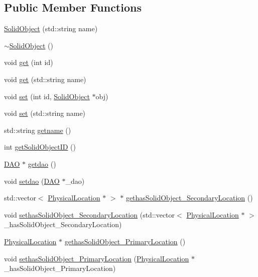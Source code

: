 \subsection*{Public Member Functions}
\begin{DoxyCompactItemize}
\item 
\hyperlink{class_solid_object_a8d752aace544c358d941c01b5786d2ee}{SolidObject} (std::string name)
\item 
\hyperlink{class_solid_object_a78b7c6dec129da027e767eb5d6303f6e}{$\sim$SolidObject} ()
\item 
void \hyperlink{class_solid_object_a76502cdc5f302d769508f196a0358d04}{get} (int id)
\item 
void \hyperlink{class_solid_object_afb027c9baf0d811d6f376abc10501ac9}{get} (std::string name)
\item 
void \hyperlink{class_solid_object_a02a27880f080df5e547ab316572173b9}{set} (int id, \hyperlink{class_solid_object}{SolidObject} $\ast$obj)
\item 
void \hyperlink{class_solid_object_aaa81c29478f33c17cf15ad1409fc06b2}{set} (std::string name)
\item 
std::string \hyperlink{class_solid_object_ae7b8a41f898f9463c0e298d3477fd95f}{getname} ()
\item 
int \hyperlink{class_solid_object_aa25bf35a0820f919489ce284cbdad480}{getSolidObjectID} ()
\item 
\hyperlink{class_d_a_o}{DAO} $\ast$ \hyperlink{class_solid_object_a82697845082b48fb3b2b90606e68259a}{getdao} ()
\item 
void \hyperlink{class_solid_object_aebdfc641ee348624ac5027e0a570dcd8}{setdao} (\hyperlink{class_d_a_o}{DAO} $\ast$\_\-dao)
\item 
std::vector$<$ \hyperlink{class_physical_location}{PhysicalLocation} $\ast$ $>$ $\ast$ \hyperlink{class_solid_object_a6cff7d32505f5b3ce164c47aec0b56b6}{gethasSolidObject\_\-SecondaryLocation} ()
\item 
void \hyperlink{class_solid_object_a59290450f18c6c6528617ac3381ca768}{sethasSolidObject\_\-SecondaryLocation} (std::vector$<$ \hyperlink{class_physical_location}{PhysicalLocation} $\ast$ $>$ \_\-hasSolidObject\_\-SecondaryLocation)
\item 
\hyperlink{class_physical_location}{PhysicalLocation} $\ast$ \hyperlink{class_solid_object_abc1f285475f676c37292225bcee32bf5}{gethasSolidObject\_\-PrimaryLocation} ()
\item 
void \hyperlink{class_solid_object_a6877b394cdd5065f6ef07355135be952}{sethasSolidObject\_\-PrimaryLocation} (\hyperlink{class_physical_location}{PhysicalLocation} $\ast$\_\-hasSolidObject\_\-PrimaryLocation)

\end{DoxyCompactItemize}
